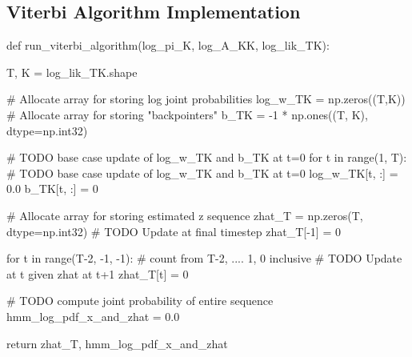 \documentclass[10pt]{article}
\begin{document}
\subsection{Viterbi Algorithm Implementation}
\begin{python}
def run_viterbi_algorithm(log_pi_K, log_A_KK, log_lik_TK):

	T, K = log_lik_TK.shape

	# Allocate array for storing log joint probabilities
	log_w_TK = np.zeros((T,K))
	# Allocate array for storing "backpointers"
	b_TK = -1 * np.ones((T, K), dtype=np.int32)

	# TODO base case update of log_w_TK and b_TK at t=0
	for t in range(1, T):
		# TODO base case update of log_w_TK and b_TK at t=0
		log_w_TK[t, :] = 0.0
		b_TK[t, :] = 0

	# Allocate array for storing estimated z sequence
	zhat_T = np.zeros(T, dtype=np.int32)
	# TODO Update at final timestep
	zhat_T[-1] = 0

	for t in range(T-2, -1, -1): # count from T-2, .... 1, 0 inclusive
		# TODO Update at t given zhat at t+1
		zhat_T[t] = 0

	# TODO compute joint probability of entire sequence
	hmm_log_pdf_x_and_zhat = 0.0

	return zhat_T, hmm_log_pdf_x_and_zhat
\end{python}
\end{document}
